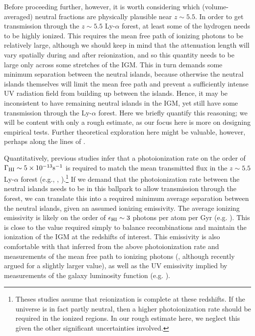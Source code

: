  Before proceeding further, however, it is worth considering which (volume-averaged) neutral fractions are physically plausible near $z \sim 5.5$. In order to get transmission through
 the $z \sim 5.5$ Ly-$\alpha$ forest, at least some of the hydrogen needs to be highly ionized.  This requires the mean free path of ionizing photons to be relatively large, although we should keep in mind that the attenuation length will vary spatially during and after reionization, and so this quantity needs to be large only across some stretches of the IGM.
 This in turn demands some minimum separation between the neutral islands, because otherwise the neutral islands themselves will limit the mean free path and prevent a sufficiently
 intense UV radiation field from building up between the islands. Hence, it may be inconsistent to have remaining neutral islands in the IGM, yet still have some transmission through the Ly-$\alpha$ forest. Here we briefly quantify this reasoning; we will be content with only a rough estimate, as our focus
here is more on designing empirical tests. Further theoretical
exploration here might be valuable, however, perhaps along the lines of \cite{Xu:2013npa}. 

Quantitatively, previous studies infer that a photoionization rate on the order of $\Gamma_{\rm HI} \sim 5 \times 10^{-13} \text{s}^{-1}$ is required to match the mean transmitted flux in the
$z \sim 5.5$ Ly-$\alpha$ forest (e.g., \citealt{KuhlenConcordance}, \citealt{Bolton:2007b}).\footnote{Theses studies assume that reionization is complete at these redshifts. If the universe is in fact partly neutral, then a higher photoionization rate should be required in the ionized regions. In our rough estimate here, we neglect this given the other significant uncertainties involved.}
If we demand that the photoionization rate between the neutral islands needs to be in this ballpark to allow transmission through the forest, we can translate this into a required minimum average separation
between the neutral islands, given an assumed ionizing emissivity. The average ionizing emissivity is likely on the order of $\epsilon_{\rm HI} \sim 3$ photons per atom per Gyr (e.g. \citealt{Bolton:2007b}).
This is close to the value required simply to balance recombinations and maintain the ionization of the IGM at the redshifts of interest. This emissivity is also comfortable with that inferred from the above
photoionization rate and measurements of the mean free path to ionizing photons (\citealt{Bolton:2007b}, although \citealt{Becker:2013ffa} recently argued for a slightly larger value), as well as the UV emissivity implied by measurements of the galaxy luminosity function (e.g. \citealt{Robertson:2013bq}).
  

